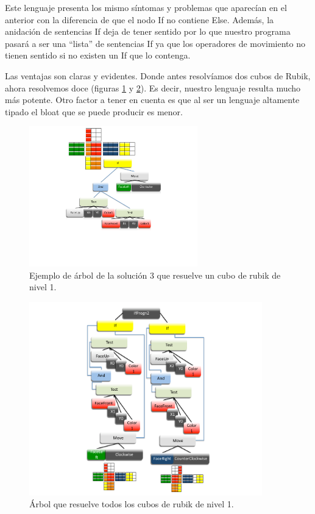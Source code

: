Este lenguaje presenta los mismo síntomas y problemas que aparecían en el 
anterior con la diferencia de que el nodo If no contiene Else. Además, la
anidación de sentencias If deja de tener sentido por lo que nuestro programa
pasará a ser una “lista” de sentencias If ya que los operadores de movimiento no
tienen sentido si no existen un If que lo contenga.

Las ventajas son claras y evidentes. Donde antes resolvíamos dos cubos de Rubik,
ahora resolvemos doce (figuras \ref{fig:leng3ejem1} y \ref{fig:leng3ejem2}). Es
decir, nuestro lenguaje resulta mucho más potente. Otro factor a tener en cuenta es que al ser un lenguaje altamente tipado el bloat que
se puede producir es menor.




\begin{figure}[t]
\centering
\includegraphics[width=0.65\textwidth]{figs/pdf/leng3ejem1}
\caption{Ejemplo de árbol de la solución 3 que resuelve un cubo de rubik de nivel 1.}
\label{fig:leng3ejem1}
\end{figure}

\begin{figure}[t]
\centering
\includegraphics[width=0.9\textwidth]{figs/pdf/leng3ejem2}
\caption{Árbol que resuelve todos los cubos de rubik de nivel 1.}
\label{fig:leng3ejem2}
\end{figure}

